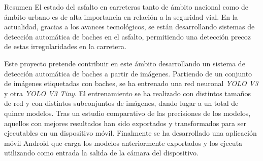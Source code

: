 \begin{poliabstract}{Resumen}
\noindent
El estado del asfalto en carreteras tanto de ámbito nacional como de ámbito urbano es de alta importancia en relación a la seguridad vial. En la actualidad, gracias a los avances tecnológicos, se están desarrollando sistemas de detección automática de baches en el asfalto, permitiendo una detección precoz de estas irregularidades en la carretera.

\doublespacing\singlespacing
\noindent
Este proyecto pretende contribuir en este ámbito desarrollando un sistema de detección automática de baches a partir de imágenes. Partiendo de un conjunto de imágenes etiquetadas con baches, se ha entrenado una red neuronal \textit{YOLO V3} y otra \textit{YOLO V3 Tiny}. El entrenamiento se ha realizado con distintos tamaños de red y con distintos subconjuntos de imágenes, dando lugar a un total de quince modelos. Tras un estudio comparativo de las precisiones de los modelos, aquellos con mejores resultados han sido exportados y transformados para ser ejecutables en un dispositivo móvil. Finalmente se ha desarrollado una aplicación móvil Android que carga los modelos anteriormente exportados y los ejecuta utilizando como entrada la salida de la cámara del dispositivo.
\end{poliabstract}